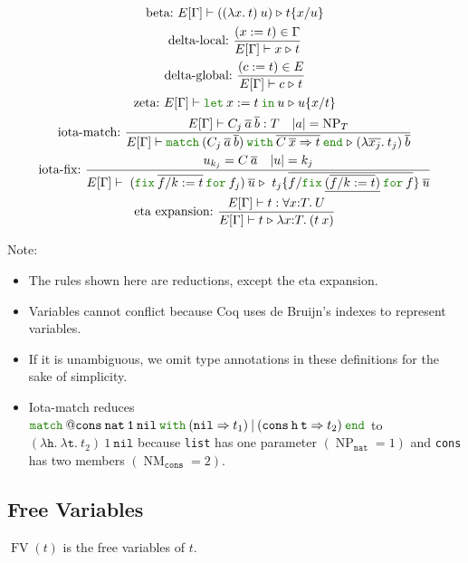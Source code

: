\documentclass[a4paper,fleqn]{article}
\def\coq{\textrm{Coq}}
\newcommand{\kwlet}{\mbox{\color{mygreen}\ttfamily let}}
\newcommand{\kwin}{\mbox{\color{mygreen}\ttfamily in}}
\newcommand{\kwmatch}{\mbox{\color{mygreen}\ttfamily match}}
\newcommand{\kwwith}{\mbox{\color{mygreen}\ttfamily with}}
\newcommand{\kwend}{\mbox{\color{mygreen}\ttfamily end}}
\newcommand{\kwfix}{\mbox{\color{mygreen}\ttfamily fix}}
\newcommand{\kwfor}{\mbox{\color{mygreen}\ttfamily for}}
\newcommand{\lam}[2]{\lambda #1.\:#2}
\newcommand{\lamT}[3]{\lambda #1\mathord{:}#2.\:#3}
\newcommand{\prodT}[3]{\forall #1\mathord{:}#2.\:#3}
\newcommand{\letin}[3]{\kwlet\:#1:=#2\:\kwin\:#3}
\newcommand{\omatch}[2]{\kwmatch\:#1\:\kwwith\:{#2}\:\kwend}
\newcommand{\ofix}[2]{\kwfix\:{#1}\:\kwfor\:{#2}}
\DeclareMathOperator{\NP}{NP} %
\DeclareMathOperator{\NM}{NM} %
\DeclareMathOperator{\FV}{FV}
\newcommand{\WT}[4]{\ensuremath{#1[#2] \vdash #3 : #4}}
\newcommand{\WTE}[3]{\WT{E}{#1}{#2}{#3}}
\newcommand{\WTEG}[2]{\WTE{\Gamma}{#1}{#2}}
\newcommand{\subst}[3]{#1\{#2/#3\}}
\newcommand{\substm}[3]{#1\{\overline{#2/#3}\}}
\newcommand{\reltri}{\mathrel{\triangleright}}
\newcommand{\rep}[1]{\overline{#1}}
\begin{document}
\begin{gather*}
  \text{beta:}~
    E[\Gamma] \vdash ((\lam{x}{t})\:u) \reltri \subst{t}{x}{u} \\
  \text{delta-local:}~
    \dfrac{(x:=t) \in \Gamma}{E[\Gamma] \vdash x \reltri t} \\
  \text{delta-global:}~
    \dfrac{(c:=t) \in E}{E[\Gamma] \vdash c \reltri t} \\
  \text{zeta:}~
    E[\Gamma] \vdash \letin{x}{t}{u} \reltri \subst{u}{x}{t} \\
  \text{iota-match:}~
    \dfrac
    {
      E[\Gamma] \vdash C_j\:\rep{a}\:\rep{b} : T \quad
      \text{$|a| = \NP_T$}
    }{
      E[\Gamma] \vdash
      \omatch{(C_j\:\rep{a}\:\rep{b})}{\rep{C\:\rep{x}\Rightarrow t}}
      \reltri
      (\lam{\rep{x_j}}{t_j})\:\rep{b}
    } \\
  \text{iota-fix:}~
    \dfrac{
      u_{k_j} = C\:\rep{a} \quad
      |u| = k_j
    }{
      E[\Gamma] \vdash\; (\ofix{\rep{f/k:=t}}{f_j})\:\rep{u} \reltri\; \substm{t_j}{f}{\ofix{\underline{(\rep{f/k:=t})}}{f}} \: \rep{u}
    } \\
  \text{eta expansion:}~
    \dfrac{\WTEG{t}{\prodT{x}{T}{U}}}{E[\Gamma] \vdash t \reltri \lamT{x}{T}{(t\:x)}}
\end{gather*}
{\small Note:
\begin{itemize}
  \item The rules shown here are reductions, except the eta expansion.
  \item Variables cannot conflict because \coq{} uses de Bruijn's indexes to represent variables.
  \item If it is unambiguous, we omit type annotations in these definitions for the sake of simplicity.
  \item Iota-match reduces $\kwmatch\:\mathtt{@cons\:nat\:1\:nil}\:\kwwith\:(\mathtt{nil} \Rightarrow t_1)\:|\:(\mathtt{cons}\:\mathtt{h}\:\mathtt{t} \Rightarrow t_2)\:\kwend$ to $(\lam{\mathtt{h}}{\lam{\mathtt{t}}{t_2}})\:1\:\mathtt{nil}$
    because \lstinline!list! has one parameter $(\NP_\mathtt{nat}=1)$ and \lstinline!cons! has two members $(\NM_\mathtt{cons}=2)$.
\end{itemize}}

\subsection{Free Variables}

$\FV(t)$ is the free variables of $t$.
\end{document}
